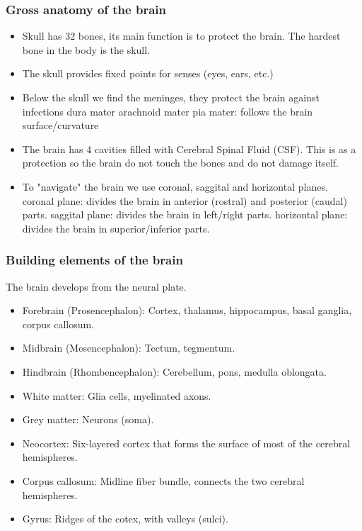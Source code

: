 \documentclass[main]{subfiles}
\begin{document}
\subsubsection{Gross anatomy of the brain}
\begin{itemize}
\item Skull has 32 bones, its main function is to protect the brain. The hardest bone in the body is the skull.
\item The skull provides fixed points for senses (eyes, ears, etc.)
\item Below the skull we find the meninges, they protect the brain against infections
\subitem dura mater
\subitem arachnoid mater
\subitem pia mater: follows the brain surface/curvature
\item The brain has 4 cavities filled with Cerebral Spinal Fluid (CSF). This is as a protection so the brain do not touch the bones and do not damage itself.
\item To "navigate" the brain we use coronal, saggital and horizontal planes.
\subitem coronal plane: divides the brain in anterior (rostral) and posterior (caudal) parts.
\subitem saggital plane: divides the brain in left/right parts.
\subitem horizontal plane: divides the brain in superior/inferior parts.
\end{itemize}

\subsubsection{Building elements of the brain}
The brain develops from the neural plate.

\begin{itemize}[noitemsep,nolistsep]
	\item Forebrain (Prosencephalon): Cortex, thalamus, hippocampus, basal ganglia, corpus callosum.
	\item Midbrain (Mesencephalon): Tectum, tegmentum.
	\item Hindbrain (Rhombencephalon): Cerebellum, pons, medulla oblongata.
	\item White matter: Glia cells, myelinated axons.
	\item Grey matter: Neurons (soma).
	\item Neocortex: Six-layered cortex that forms the surface of most of the cerebral hemispheres.
	\item Corpus callosum: Midline fiber bundle, connects the two cerebral hemispheres.
	\item Gyrus: Ridges of the cotex, with valleys (sulci).
\end{itemize}
\end{document}
